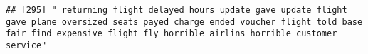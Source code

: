 \documentclass[
]{article}
\begin{document}
\begin{verbatim}
## [295] " returning flight delayed hours update gave update flight gave plane oversized seats payed charge ended voucher flight told base fair find expensive flight fly horrible airlins horrible customer service"                                                                                                                                                                                                                                                                                                                                                                                                                                                                                                                                                                                                                                                                                                                                                                                                                                                                                                                                                                                                                                                                                                                                                                                                                                                                                                                                                                                                                                                                                                                                                                                    

\end{verbatim}
\end{document}
